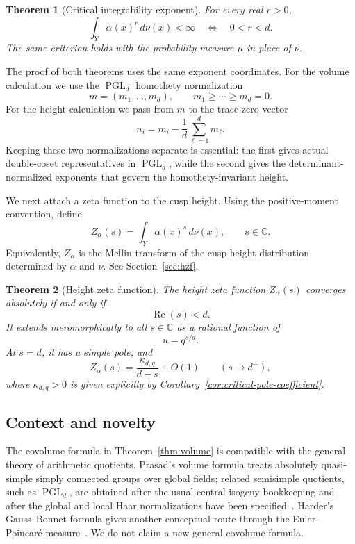 \documentclass[11pt]{amsart}
\newcommand{\CC}{\mathbb C}
\newcommand{\PGL}{\operatorname{PGL}}
\theoremstyle{plain}
\newtheorem{theorem}{Theorem}[section]
\theoremstyle{definition}
\numberwithin{equation}{section}
\begin{document}
\begin{theorem}[Critical integrability exponent]\label{thm:integrability}
For every real $r>0$,
\[
  \int_Y \alpha(x)^r\,d\nu(x)<\infty
  \quad\Longleftrightarrow\quad
  0<r<d.
\]
The same criterion holds with the probability measure $\mu$ in place of $\nu$.
\end{theorem}

The proof of both theorems uses the same exponent coordinates.  For the volume calculation
we use the $\PGL_d$ homothety normalization
\[
  m=(m_1,\ldots,m_d),\qquad m_1\ge\cdots\ge m_d=0.
\]
For the height calculation we pass from $m$ to the trace-zero vector
\[
  n_i=m_i-\frac1d\sum_{\ell=1}^d m_\ell.
\]
Keeping these two normalizations separate is essential: the first gives actual double-coset
representatives in $\PGL_d$, while the second gives the determinant-normalized exponents
that govern the homothety-invariant height.

We next attach a zeta function to the cusp height.  Using the
positive-moment convention, define
\begin{equation}\label{eq:zeta-s}
  Z_\alpha(s)=\int_Y \alpha(x)^s\,d\nu(x),
  \qquad s\in\CC.
\end{equation}
Equivalently, \(Z_\alpha\) is the Mellin transform of the
cusp-height distribution determined by \(\alpha\) and \(\nu\). See Section~\ref{sec:hzf}.

\begin{theorem}[Height zeta function]\label{thm:height-zeta-main}
The height zeta function \(Z_\alpha(s)\) converges absolutely if and only if
\[
  \operatorname{Re}(s)<d.
\]
It extends meromorphically to all \(s\in\CC\) as a rational function of
\[
  u=q^{s/d}.
\]
At \(s=d\), it has a simple pole, and
\[
  Z_\alpha(s)=\frac{\kappa_{d,q}}{d-s}+O(1)
  \qquad (s\to d^-),
\]
where \(\kappa_{d,q}>0\) is given explicitly by
Corollary~\ref{cor:critical-pole-coefficient}.
\end{theorem}


\subsection*{Context and novelty}

The covolume formula in Theorem~\ref{thm:volume} is compatible with the general theory of
arithmetic quotients. Prasad's volume formula treats absolutely quasi-simple simply
connected groups over global fields; related semisimple quotients, such as $\PGL_d$, are
obtained after the usual central-isogeny bookkeeping and after the global and local Haar
normalizations have been specified~\cite{Prasad}.  Harder's Gauss--Bonnet formula gives
another conceptual route through the Euler--Poincar\'e measure~\cite{Harder}.  We do not
claim a new general covolume formula.
\end{document}
